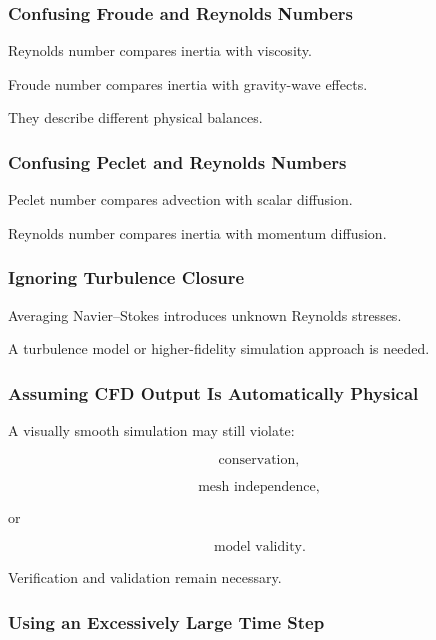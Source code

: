 \subsubsection{Confusing Froude and Reynolds Numbers}

Reynolds number compares inertia with viscosity.

Froude number compares inertia with gravity-wave effects.

They describe different physical balances.

\subsubsection{Confusing Peclet and Reynolds Numbers}

Peclet number compares advection with scalar diffusion.

Reynolds number compares inertia with momentum diffusion.

\subsubsection{Ignoring Turbulence Closure}

Averaging Navier--Stokes introduces unknown Reynolds stresses.

A turbulence model or higher-fidelity simulation approach is needed.

\subsubsection{Assuming CFD Output Is Automatically Physical}

A visually smooth simulation may still violate:

\[
\boxed{
\text{conservation},
}
\]

\[
\boxed{
\text{mesh independence},
}
\]

or

\[
\boxed{
\text{model validity}.
}
\]

Verification and validation remain necessary.

\subsubsection{Using an Excessively Large Time Step}

